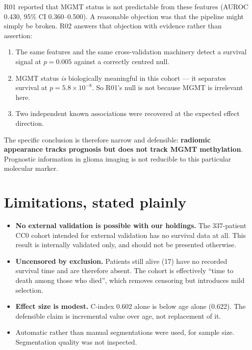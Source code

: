 \documentclass[11pt,a4paper]{article}
\begin{document}
R01 reported that MGMT status is not predictable from these features (AUROC 0.430, 95\% CI
0.360--0.500). A reasonable objection was that the pipeline might simply be broken. R02
answers that objection with evidence rather than assertion:

\begin{enumerate}[leftmargin=1.6em,nosep]
\item The same features and the same cross-validation machinery detect a survival signal at
$p = 0.005$ against a correctly centred null.
\item MGMT status \emph{is} biologically meaningful in this cohort --- it separates survival
at $p = 5.8\times10^{-8}$. So R01's null is not because MGMT is irrelevant here.
\item Two independent known associations were recovered at the expected effect direction.
\end{enumerate}

\noindent
The specific conclusion is therefore narrow and defensible: \textbf{radiomic appearance
tracks prognosis but does not track MGMT methylation}. Prognostic information in glioma
imaging is not reducible to this particular molecular marker.

\section{Limitations, stated plainly}

\begin{itemize}[leftmargin=1.4em,nosep]
\item \textbf{No external validation is possible with our holdings.} The 337-patient CC0
cohort intended for external validation has no survival data at all. This result is
internally validated only, and should not be presented otherwise.
\item \textbf{Uncensored by exclusion.} Patients still alive (17) have no recorded survival
time and are therefore absent. The cohort is effectively ``time to death among those who
died'', which removes censoring but introduces mild selection.
\item \textbf{Effect size is modest.} C-index 0.602 alone is below age alone (0.622). The
defensible claim is incremental value over age, not replacement of it.
\item Automatic rather than manual segmentations were used, for sample size. Segmentation
quality was not inspected.
\end{itemize}
\end{document}
